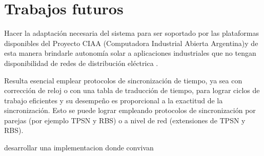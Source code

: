 \section{Trabajos futuros}

Hacer la adaptación necesaria del sistema para ser soportado por las plataformas disponibles del Proyecto CIAA \citep{CIAA} (Computadora Industrial Abierta Argentina)y de esta manera brindarle autonomía solar a aplicaciones industriales que no tengan disponibilidad de redes de distribución eléctrica .

Resulta esencial emplear protocolos de sincronización de tiempo, ya sea con corrección de reloj o con una tabla de traducción de tiempo, para lograr ciclos de trabajo eficientes y su desempeño es proporcional a la exactitud de la sincronización. Esto se puede lograr empleando protocolos de sincronización por parejas (por ejemplo TPSN y RBS) o a nivel de red (extensiones de TPSN y RBS).

desarrollar una implementacion donde convivan





